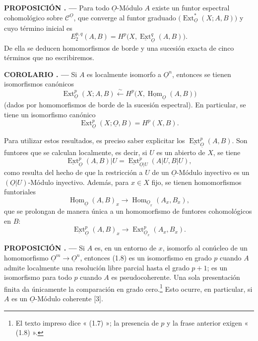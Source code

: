 \documentclass[11pt,twoside,openany]{book}
\numberwithin{equation}{section}
\newcommand{\Osh}{\underline{O}}
\newcommand{\Ccat}{\mathcal C}
\newcommand{\Homsh}{\underline{\operatorname{Hom}}}
\newcommand{\Extsh}{\underline{\operatorname{Ext}}}
\newcommand{\fquote}[1]{\textquotedbl#1\textquotedbl}
\theoremstyle{plain}
\theoremstyle{definition}
\theoremstyle{remark}
\newcommand{\result}[2]{%
  \par\medskip\noindent\textbf{#1%
  \if\relax\detokenize{#2}\relax\else\space#2\fi. ---}\enspace
}
\theoremstyle{plain}
\theoremstyle{definition}
\theoremstyle{remark}
\begin{document}
\result{PROPOSICIÓN}{1} Para todo $\Osh$-Módulo $A$ existe un funtor
espectral cohomológico sobre $\Ccat^{\Osh}$, que converge al funtor graduado
$\bigl(\operatorname{Ext}_{\Osh}^{*}(X;A,B)\bigr)$ y cuyo término inicial es
\begin{equation}\tag{1.4}
  E_{2}^{p,q}(A,B)=H^{p}\bigl(X,\Extsh_{\Osh}^{q}(A,B)\bigr).
\end{equation}
De ella se deducen \fquote{homomorfismos de borde} y una sucesión exacta de cinco términos
que no escribiremos.

\result{COROLARIO}{1} Si $A$ es localmente isomorfo a $\Osh^{n}$, entonces se tienen
isomorfismos canónicos
\begin{equation}\tag{1.5}
  \operatorname{Ext}_{\Osh}^{p}(X;A,B)
  \overset{\sim}{\longleftarrow}
  H^{p}\bigl(X,\Homsh_{\Osh}(A,B)\bigr)
\end{equation}
(dados por homomorfismos de borde de la sucesión espectral). En particular, se tiene
un isomorfismo canónico
\begin{equation}\tag{1.6}
  \operatorname{Ext}_{\Osh}^{p}(X;\Osh,B)=H^{p}(X,B).
\end{equation}

Para utilizar estos resultados, es preciso saber explicitar los
$\Extsh_{\Osh}^{p}(A,B)$. Son funtores que se calculan localmente,
es decir, si $U$ es un abierto de $X$, se tiene
\[
  \Extsh_{\Osh}^{p}(A,B)|U
  =\Extsh_{\Osh|U}^{p}(A|U,B|U),
\]
como resulta del hecho de que la restricción a $U$ de un $\Osh$-Módulo inyectivo
es un $(\Osh|U)$-Módulo inyectivo. Además, para $x\in X$ fijo, se tienen homomorfismos funtoriales
\begin{equation}\tag{1.7}
  \Homsh_{\Osh}(A,B)_x
  \longrightarrow
  \operatorname{Hom}_{\Osh_x}(A_x,B_x),
\end{equation}
que se prolongan de manera única a un homomorfismo de funtores cohomológicos
en $B$:
\begin{equation}\tag{1.8}
  \Extsh_{\Osh}^{p}(A,B)_x
  \longrightarrow
  \operatorname{Ext}_{\Osh_x}^{p}(A_x,B_x).
\end{equation}

\result{PROPOSICIÓN}{2} Si $A$ es, en un entorno de $x$, isomorfo al
conúcleo de un homomorfismo $\Osh^{m}\longrightarrow\Osh^{n}$, entonces (1.8) es un isomorfismo en grado $p$ cuando $A$ admite localmente una resolución libre parcial hasta el grado $p+1$; es un isomorfismo para todo $p$ cuando $A$ es pseudocoherente. Una sola presentación finita da únicamente la comparación en grado cero.\footnote{El texto impreso dice « (1.7) »; la
presencia de $p$ y la frase anterior exigen « (1.8) ».} Esto ocurre, en
particular, si $A$ es un $\Osh$-Módulo coherente [3].
\end{document}
